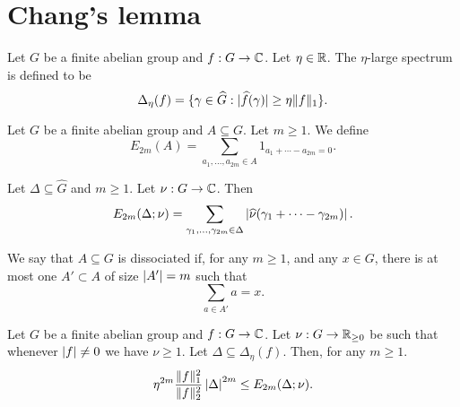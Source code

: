 \chapter{Chang's lemma}

\begin{definition}
\label{large_spec}
Let $G$ be a finite abelian group and $f:G\to\mathbb{C}$. Let $\eta\in \mathbb{R}$. The $\eta$-large spectrum is defined to be
\[\Delta_\eta(f) = \{ \gamma\in\widehat{G} : \lvert \widehat{f}(\gamma)\rvert \geq \eta\lVert f\rVert_1\}.\]
\end{definition}


\begin{definition}[Energy]
\label{energy}
Let $G$ be a finite abelian group and $A\subseteq G$. Let $m\geq 1$. We define
\[E_{2m}(A)=\sum_{a_1,\ldots,a_{2m}\in A}1_{a_1+\cdots-a_{2m}=0}.\]
\end{definition}


\begin{definition}
\label{weight_energy}
Let $\Delta\subseteq \widehat{G}$ and $m\geq 1$. Let $\nu:G\to \mathbb{C}$. Then
\[E_{2m}(\Delta;\nu)=\sum_{\gamma_1,\ldots,\gamma_{2m}\in \Delta}\left\lvert \widehat{\nu}(\gamma_1+\cdots-\gamma_{2m})\right\rvert.\]
\end{definition}


\begin{definition}[Dissociation]
\label{dissociated}
\leanok
We say that $A\subseteq G$ is dissociated if, for any $m\geq 1$, and any $x\in G$, there is at most one $A'\subset A$ of size $\left\lvert A'\right\rvert=m$ such that
\[\sum_{a\in A'}a=x.\]
\end{definition}


\begin{lemma}
\label{general_holder}
Let $G$ be a finite abelian group and $f:G\to\mathbb{C}$. Let $\nu:G\to \mathbb{R}_{\geq 0}$ be such that whenever $\left\lvert f\right\rvert\neq 0$ we have $\nu \geq 1$. Let $\Delta\subseteq \Delta_\eta(f)$. Then, for any $m\geq 1$.
\[\eta^{2m}\frac{\lVert f\rVert_1^2}{\lVert f\rVert_2^2}\left\lvert \Delta\right\rvert^{2m}\leq E_{2m}(\Delta;\nu).\]
\end{lemma}

